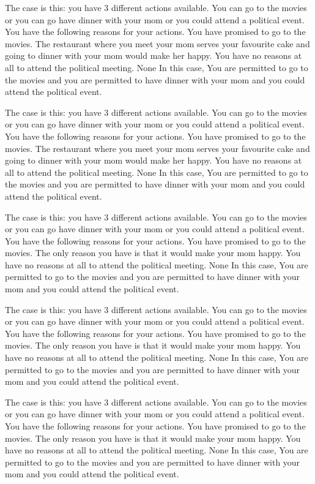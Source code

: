 The case is this: you have  3  different actions available.  You can go to the movies or you can go have dinner with your mom or you could attend a political event.
You have the following reasons for your actions.  You have promised to go to the movies. The restaurant where you meet your mom serves your favourite cake and going to dinner with your mom would make her happy. You have no reasons at all to attend the political meeting. 
None
In this case,  You are permitted to go to the movies and you are permitted to have dinner with your mom and you could attend the political event.
 
The case is this: you have  3  different actions available.  You can go to the movies or you can go have dinner with your mom or you could attend a political event.
You have the following reasons for your actions.  You have promised to go to the movies. The restaurant where you meet your mom serves your favourite cake and going to dinner with your mom would make her happy. You have no reasons at all to attend the political meeting. 
None
In this case,  You are permitted to go to the movies and you are permitted to have dinner with your mom and you could attend the political event.
 
The case is this: you have  3  different actions available.  You can go to the movies or you can go have dinner with your mom or you could attend a political event.
You have the following reasons for your actions.  You have promised to go to the movies. The only reason you have is that it would make your mom happy. You have no reasons at all to attend the political meeting. 
None
In this case,  You are permitted to go to the movies and you are permitted to have dinner with your mom and you could attend the political event.
 
The case is this: you have  3  different actions available.  You can go to the movies or you can go have dinner with your mom or you could attend a political event.
You have the following reasons for your actions.  You have promised to go to the movies. The only reason you have is that it would make your mom happy. You have no reasons at all to attend the political meeting. 
None
In this case,  You are permitted to go to the movies and you are permitted to have dinner with your mom and you could attend the political event.
 
The case is this: you have  3  different actions available.  You can go to the movies or you can go have dinner with your mom or you could attend a political event.
You have the following reasons for your actions.  You have promised to go to the movies. The only reason you have is that it would make your mom happy. You have no reasons at all to attend the political meeting. 
None
In this case,  You are permitted to go to the movies and you are permitted to have dinner with your mom and you could attend the political event.
 
